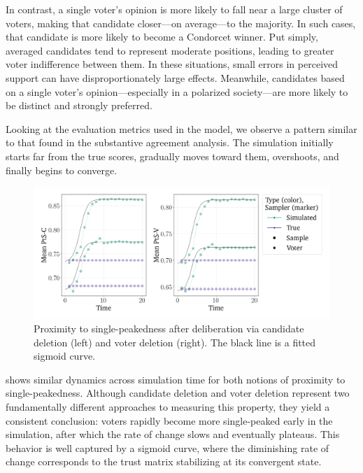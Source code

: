 In contrast, a single voter's opinion is more likely to fall near a large cluster of voters, making that candidate closer—on average—to the majority. In such cases, that candidate is more likely to become a Condorcet winner. Put simply, averaged candidates tend to represent moderate positions, leading to greater voter indifference between them. In these situations, small errors in perceived support can have disproportionately large effects. Meanwhile, candidates based on a single voter's opinion—especially in a polarized society—are more likely to be distinct and strongly preferred.

Looking at the evaluation metrics used in the model, we observe a pattern similar to that found in the substantive agreement analysis. The simulation initially starts far from the true scores, gradually moves toward them, overshoots, and finally begins to converge.

\begin{figure}[htbp]
\centering
\vspace{-9pt}
\includegraphics[width=\textwidth]{Figures/pst_measures.png}
\caption{Proximity to single-peakedness after deliberation via candidate deletion (left) and voter deletion (right). The black line is a fitted sigmoid curve.}
\label{fig:degroot_single_peaked}
\end{figure}

 shows similar dynamics across simulation time for both notions of proximity to single-peakedness. Although candidate deletion and voter deletion represent two fundamentally different approaches to measuring this property, they yield a consistent conclusion: voters rapidly become more single-peaked early in the simulation, after which the rate of change slows and eventually plateaus. This behavior is well captured by a sigmoid curve, where the diminishing rate of change corresponds to the trust matrix stabilizing at its convergent state.
